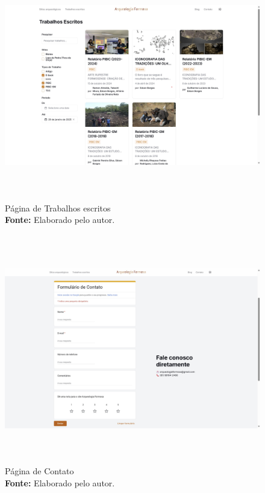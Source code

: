 
\begin{figure}[H]
    \centering
    \includegraphics[height=10cm, keepaspectratio]{img/site/Trabalhos escritos.jpg}
    \caption{Página de Trabalhos escritos \\
    \textbf{Fonte:} Elaborado pelo autor.}
    \label{fig:pagina_trabalhos}
\end{figure}


\begin{figure}[H]
    \centering
    \includegraphics[height=10cm, keepaspectratio]{img/site/contato.jpg}
    \caption{Página de Contato \\
    \textbf{Fonte:} Elaborado pelo autor.}
    \label{fig:pagina_contato}
\end{figure}


